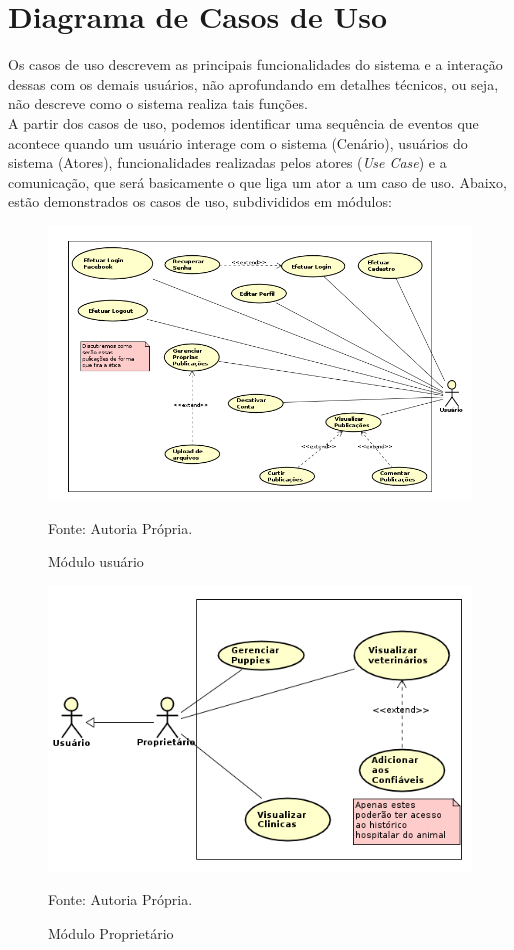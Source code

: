  \section{Diagrama de Casos de Uso}
Os casos de uso descrevem as principais funcionalidades do sistema e a interação dessas com os demais usuários, não aprofundando em detalhes técnicos, ou seja, não descreve como o sistema realiza tais funções.
\\
\indent
A partir dos casos de uso, podemos identificar uma sequência de eventos que acontece quando um usuário interage com o sistema (Cenário), usuários do sistema (Atores), funcionalidades realizadas pelos atores ({\it Use Case}) e a comunicação, que será basicamente o que liga um ator a um caso de uso. Abaixo, estão demonstrados os casos de uso, subdivididos em módulos:


\begin{figure}[h!]
	\centering	\includegraphics[scale=0.55
	]{imagens/usercasodeuso}
	\caption{Módulo usuário}
	Fonte: Autoria Própria.
	\label{Rotulo}
\end{figure}

\begin{figure}[h!]
	\centering	\includegraphics[scale=0.55
	]{imagens/ownerscasosdeuso}
	\caption{Módulo Proprietário}
	Fonte: Autoria Própria.
	\label{Rotulo}
\end{figure}

